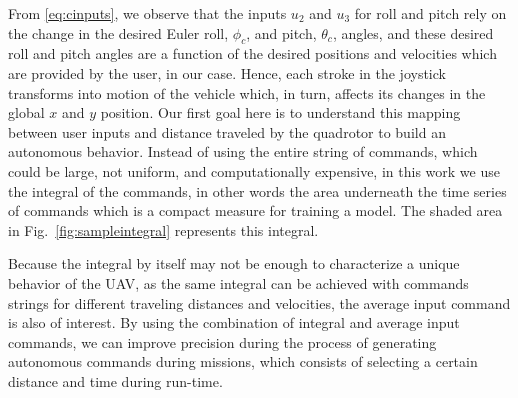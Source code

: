 \documentclass[letterpaper, 10 pt, conference]{ieeeconf}  %
\newcommand\NB[1]{$\spadesuit$\footnote{NB: #1}}
\begin{document}
From \eqref{eq:cinputs}, we observe that the inputs $u_2$ and $u_3$ for roll and pitch rely on the change in the desired Euler roll, $\phi_c$, and pitch, $\theta_c$, angles, and these desired roll and pitch angles are a function of the desired positions and velocities which are provided by the user, in our case. 
Hence, each stroke in the joystick transforms into motion of the vehicle which, in turn, affects its changes in the global $x$ and $y$ position. Our first goal here is to understand this mapping between user inputs and distance traveled by the quadrotor to build an autonomous behavior. Instead of using the entire string of commands, which could be large, not uniform, and computationally expensive, in this work we use the integral of the commands, in other words the area underneath the time series of commands which is a compact measure for training a model. The shaded area in Fig.~\ref{fig:sampleintegral} represents this integral. 



Because the integral by itself may not be enough to characterize a unique behavior of the UAV, as the same integral can be achieved with commands strings for different traveling distances and velocities, the average input command is also of interest. By using the combination of integral and average input commands, we can improve precision during the process of generating autonomous commands during missions, which consists of selecting a certain distance and time during run-time.
\end{document}
